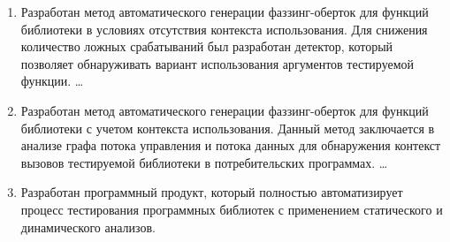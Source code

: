 \begin{enumerate}
  \item Разработан метод автоматического генерации фаззинг-оберток для функций библиотеки в условиях отсутствия контекста использования. Для снижения количество ложных срабатываний был разработан детектор, который позволяет обнаруживать вариант использования аргументов тестируемой функции.  \ldots
  \item Разработан метод автоматического генерации фаззинг-оберток для функций библиотеки с учетом контекста использования. Данный метод заключается в анализе графа потока управления и потока данных для обнаружения контекст вызовов тестируемой библиотеки в потребительских программах.  \ldots
  \item Разработан программный продукт, который полностью автоматизирует процесс тестирования программных библиотек с применением статического и динамического анализов.
\end{enumerate}
